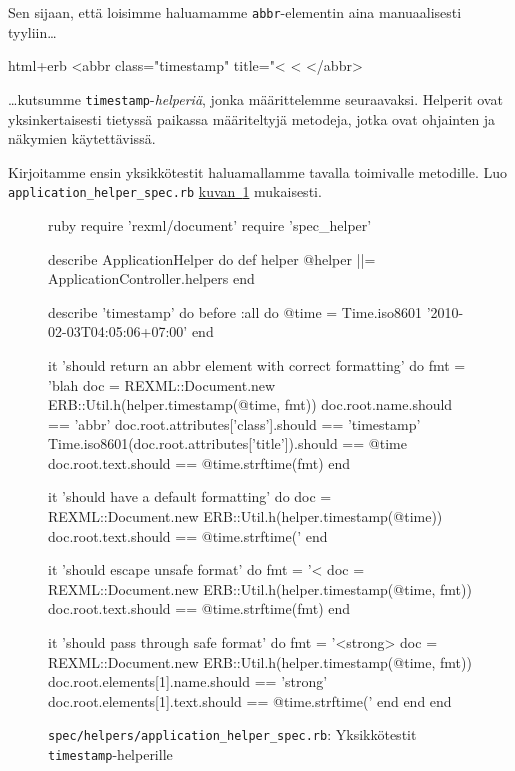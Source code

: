 \documentclass{article}
\newenvironment{myfigure}[1][tbp]{
  \begin{figure}[#1]
    \centering
    \begin{lrbox}{\myfigurebox}
      \begin{minipage}{\textwidth}
}{
      \end{minipage}
    \end{lrbox}
    \colorbox{blue!4}{\usebox{\myfigurebox}}
  \end{figure}
}
\newcommand{\myref}[2]{\hyperref[#2]{#1~\ref*{#2}}}
\begin{document}
\begin{samepage}
Sen sijaan, että loisimme haluamamme \texttt{abbr}-elementin aina manuaalisesti
tyyliin\dots

\begin{pygmented}{html+erb}
<abbr class="timestamp" title="<%
  <%
</abbr>
\end{pygmented}

\dots kutsumme \texttt{timestamp}-\emph{helperiä}, jonka määrittelemme
seuraavaksi. Helperit ovat yksinkertaisesti tietyssä paikassa määriteltyjä
metodeja, jotka ovat ohjainten ja näkymien käytettävissä.
\end{samepage}

\begin{samepage}
Kirjoitamme ensin yksikkötestit haluamallamme tavalla toimivalle metodille.
Luo \texttt{application\_helper\_spec.rb}
\myref{kuvan}{fig:timestamp-helper-spec-00} mukaisesti.

\begin{myfigure}[H]
\caption{\texttt{spec/helpers/application\_helper\_spec.rb}: Yksikkötestit
\texttt{timestamp}-helperille}
\label{fig:timestamp-helper-spec-00}

\begin{pygmented}{ruby}
require 'rexml/document'
require 'spec_helper'

describe ApplicationHelper do
  def helper
    @helper ||= ApplicationController.helpers
  end

  describe 'timestamp' do
    before :all do
      @time = Time.iso8601 '2010-02-03T04:05:06+07:00'
    end

    it 'should return an abbr element with correct formatting' do
      fmt = 'blah %
      doc = REXML::Document.new ERB::Util.h(helper.timestamp(@time, fmt))
      doc.root.name.should == 'abbr'
      doc.root.attributes['class'].should == 'timestamp'
      Time.iso8601(doc.root.attributes['title']).should == @time
      doc.root.text.should == @time.strftime(fmt)
    end

    it 'should have a default formatting' do
      doc = REXML::Document.new ERB::Util.h(helper.timestamp(@time))
      doc.root.text.should == @time.strftime('%
    end

    it 'should escape unsafe format' do
      fmt = '<%
      doc = REXML::Document.new ERB::Util.h(helper.timestamp(@time, fmt))
      doc.root.text.should == @time.strftime(fmt)
    end

    it 'should pass through safe format' do
      fmt = '<strong>%
      doc = REXML::Document.new ERB::Util.h(helper.timestamp(@time, fmt))
      doc.root.elements[1].name.should == 'strong'
      doc.root.elements[1].text.should == @time.strftime('%
    end
  end
end
\end{pygmented}
\end{myfigure}
\end{samepage}
\end{document}
